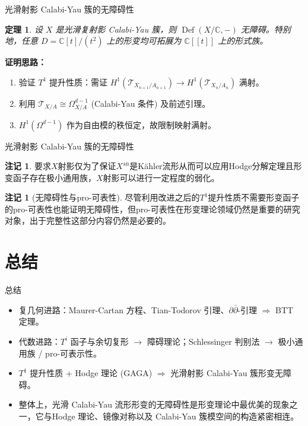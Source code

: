 \documentclass{beamer}
\theoremstyle{definition}
\newtheorem{remark}[defn]{注记}
\theoremstyle{plain}
\newtheorem{thm}[defn]{定理}
\begin{document}
\begin{frame}{光滑射影 Calabi-Yau 簇的无障碍性}
\begin{thm}
设 $X$ 是光滑复射影 Calabi-Yau 簇，则 $\operatorname{Def}(X/\mathbb{C},-)$ 无障碍。特别地，任意 $D=\mathbb{C}[t]/(t^2)$ 上的形变均可拓展为 $\mathbb{C}[[t]]$ 上的形式族。
\end{thm}
\textbf{证明思路：}
\begin{enumerate}
    \item 验证 $T^1$ 提升性质：需证 $H^1(\mathcal{T}_{X_{n+1}/A_{n+1}})\to H^1(\mathcal{T}_{X_n/A_n})$ 满射。
    \item 利用 $\mathcal{T}_{X/A}\cong\Omega^{d-1}_{X/A}$ (Calabi-Yau 条件) 及前述引理。
    \item $H^1(\Omega^{d-1})$ 作为自由模的秩恒定，故限制映射满射。
\end{enumerate}

\end{frame}

\begin{frame}{光滑射影 Calabi-Yau 簇的无障碍性}
    \begin{remark}
        要求$ X $射影仅为了保证$ X^{\mathrm{an}} $是Kähler流形从而可以应用Hodge分解定理且形变函子存在极小通用族，$ X $射影可以进行一定程度的弱化。
    \end{remark}
    \begin{remark}[无障碍性与pro-可表性]
        尽管利用改进之后的$ T^1 $提升性质不需要形变函子的pro-可表性也能证明无障碍性，但pro-可表性在形变理论领域仍然是重要的研究对象，出于完整性这部分内容仍然是必要的。
    \end{remark}
\end{frame}

\section{总结}
\begin{frame}{总结}
\begin{itemize}
    \item 复几何进路：Maurer-Cartan 方程、Tian-Todorov 引理、$\partial\bar\partial$-引理 $\Rightarrow$ BTT 定理。
    \item 代数进路：$T^i$ 函子与余切复形 $\to$ 障碍理论；Schlessinger 判别法 $\to$ 极小通用族 / pro-可表示性。
    \item $T^1$ 提升性质 + Hodge 理论 (GAGA) $\Rightarrow$ 光滑射影 Calabi-Yau 簇形变无障碍。
    \item 整体上，光滑 Calabi-Yau 流形形变的无障碍性是形变理论中最优美的现象之一，它与Hodge 理论、镜像对称以及 Calabi-Yau 簇模空间的构造紧密相连。
\end{itemize}
\end{frame}
\end{document}
